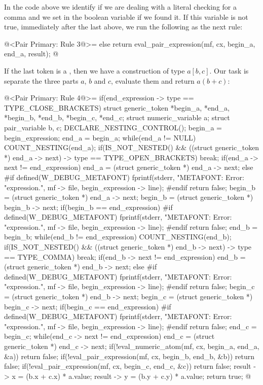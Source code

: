 In the code above we identify if we are dealing with a literal
checking for a comma and we set in the boolean
variable  if we found it. If this variable is not
true, immediately after the last  above, we run the
following  as the next rule:

\iniciocodigo
@<Pair Primary: Rule 3@>=
else{
  return eval_pair_expression(mf, cx, begin_a, end_a, result);
}
@
\fimcodigo

If the last token is a \monoespaco{]}, then we have a construction of
type $a[b,c]$. Our task is separate the three parts $a$, $b$ and $c$, evaluate them and return $a(b+c)$:

\iniciocodigo
@<Pair Primary: Rule 4@>=
if(end_expression -> type == TYPE_CLOSE_BRACKETS){
  struct generic_token *begin_a, *end_a, *begin_b, *end_b, *begin_c,
                       *end_c;
  struct numeric_variable a;
  struct pair_variable b, c;
  DECLARE_NESTING_CONTROL();
  begin_a = begin_expression;
  end_a = begin_a;
  while(end_a != NULL){
    COUNT_NESTING(end_a);
    if(IS_NOT_NESTED() &&
       ((struct generic_token *) end_a -> next) -> type ==
        TYPE_OPEN_BRACKETS)
      break;
    if(end_a -> next != end_expression)
      end_a = (struct generic_token *) end_a -> next;
    else{
#if defined(W_DEBUG_METAFONT)
      fprintf(stderr, "METAFONT: Error: %
              "expression.\n ", mf -> file, begin_expression -> line);
#endif
      return false;
    }
  }
  begin_b = (struct generic_token *) end_a -> next;
  begin_b = (struct generic_token *) begin_b -> next;
  if(begin_b == end_expression){
#if defined(W_DEBUG_METAFONT)
    fprintf(stderr, "METAFONT: Error: %
            "expression.\n ", mf -> file, begin_expression -> line);
#endif
    return false;
  }
  end_b = begin_b;
  while(end_b != end_expression){
    COUNT_NESTING(end_b);
    if(IS_NOT_NESTED() &&
       ((struct generic_token *) end_b -> next) -> type == TYPE_COMMA)
      break;
    if(end_b -> next != end_expression)
      end_b = (struct generic_token *) end_b -> next;
    else{
#if defined(W_DEBUG_METAFONT)
      fprintf(stderr, "METAFONT: Error: %
              "expression.\n ", mf -> file, begin_expression -> line);
#endif
      return false;
    }
  }
  begin_c = (struct generic_token *) end_b -> next;
  begin_c = (struct generic_token *) begin_c -> next;
  if(begin_c == end_expression){
#if defined(W_DEBUG_METAFONT)
    fprintf(stderr, "METAFONT: Error: %
            "expression.\n ", mf -> file, begin_expression -> line);
#endif
    return false;
  }
  end_c = begin_c;
  while(end_c -> next != end_expression)
    end_c = (struct generic_token *) end_c -> next;
  if(!eval_numeric_atom(mf, cx, begin_a, end_a, &a))
    return false;
  if(!eval_pair_expression(mf, cx, begin_b, end_b, &b))
    return false;
  if(!eval_pair_expression(mf, cx, begin_c, end_c, &c))
    return false;
  result -> x = (b.x + c.x) * a.value;
  result -> y = (b.y + c.y) * a.value;
  return true;
}
@
\fimcodigo

